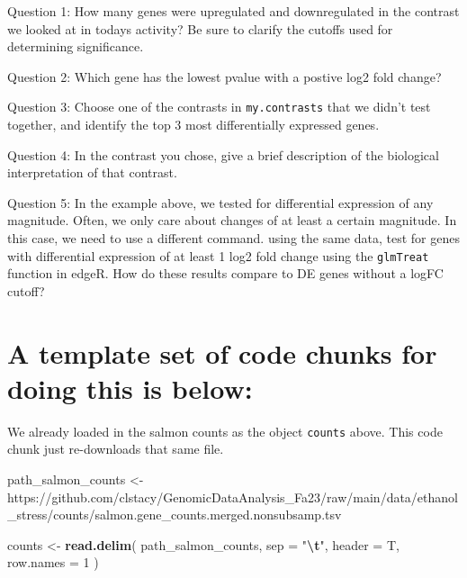 \documentclass[
]{book}
\newenvironment{Shaded}{\begin{snugshade}}{\end{snugshade}}
\newcommand{\AttributeTok}[1]{\textcolor[rgb]{0.13,0.29,0.53}{#1}}
\newcommand{\DecValTok}[1]{\textcolor[rgb]{0.00,0.00,0.81}{#1}}
\newcommand{\FunctionTok}[1]{\textcolor[rgb]{0.13,0.29,0.53}{\textbf{#1}}}
\newcommand{\NormalTok}[1]{#1}
\newcommand{\OtherTok}[1]{\textcolor[rgb]{0.56,0.35,0.01}{#1}}
\newcommand{\SpecialCharTok}[1]{\textcolor[rgb]{0.81,0.36,0.00}{\textbf{#1}}}
\newcommand{\StringTok}[1]{\textcolor[rgb]{0.31,0.60,0.02}{#1}}
\begin{document}
Question 1: How many genes were upregulated and downregulated in the
contrast we looked at in todays activity? Be sure to clarify the cutoffs
used for determining significance.

Question 2: Which gene has the lowest pvalue with a postive log2 fold
change?

Question 3: Choose one of the contrasts in \texttt{my.contrasts} that we didn't
test together, and identify the top 3 most differentially expressed
genes.

Question 4: In the contrast you chose, give a brief description of the
biological interpretation of that contrast.

Question 5: In the example above, we tested for differential expression of any magnitude. Often, we only care about changes of at least a certain magnitude. In this case, we need to use a different command. using the same data, test for genes with differential expression of at least 1 log2 fold change using the \texttt{glmTreat} function in edgeR. How do these results compare to DE genes without a logFC cutoff?

\hypertarget{a-template-set-of-code-chunks-for-doing-this-is-below}{%
\section{A template set of code chunks for doing this is below:}\label{a-template-set-of-code-chunks-for-doing-this-is-below}}

We already loaded in the salmon counts as the object \texttt{counts}
above. This code chunk just re-downloads that same file.

\begin{Shaded}
\begin{Highlighting}[]
\NormalTok{path\_salmon\_counts }\OtherTok{\textless{}{-}} \StringTok{\textquotesingle{}https://github.com/clstacy/GenomicDataAnalysis\_Fa23/raw/main/data/ethanol\_stress/counts/salmon.gene\_counts.merged.nonsubsamp.tsv\textquotesingle{}}

\NormalTok{counts }\OtherTok{\textless{}{-}} \FunctionTok{read.delim}\NormalTok{(}
\NormalTok{    path\_salmon\_counts,}
    \AttributeTok{sep =} \StringTok{"}\SpecialCharTok{\textbackslash{}t}\StringTok{"}\NormalTok{,}
    \AttributeTok{header =}\NormalTok{ T,}
    \AttributeTok{row.names =} \DecValTok{1}
\NormalTok{  )}
\end{Highlighting}
\end{Shaded}
\end{document}
